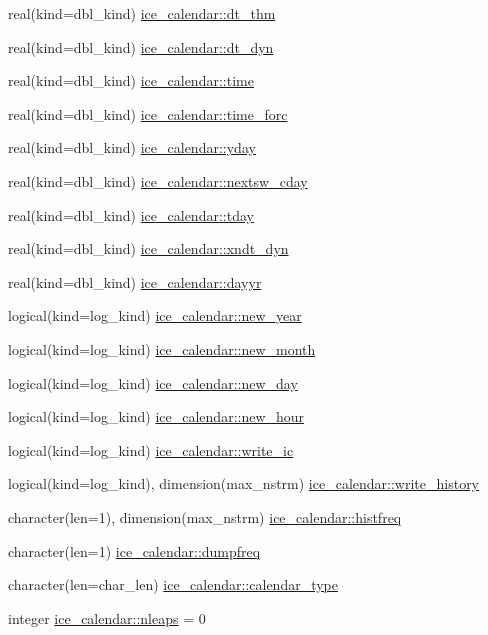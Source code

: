 \begin{DoxyCompactItemize}
\item 
real(kind=dbl\_\-kind) \hyperlink{namespaceice__calendar_a7c18b75ed60a7c1d0cbee86f4bca61de}{ice\_\-calendar::dt\_\-thm}
\item 
real(kind=dbl\_\-kind) \hyperlink{namespaceice__calendar_a3bb2bcfc8ce6074351961d80011c706a}{ice\_\-calendar::dt\_\-dyn}
\item 
real(kind=dbl\_\-kind) \hyperlink{namespaceice__calendar_a41fbc8dd30edf8e90070b7f5569fdd9b}{ice\_\-calendar::time}
\item 
real(kind=dbl\_\-kind) \hyperlink{namespaceice__calendar_abc4a1fb6d6f8356506f078c4265a6ce6}{ice\_\-calendar::time\_\-forc}
\item 
real(kind=dbl\_\-kind) \hyperlink{namespaceice__calendar_a4b4393c99a1d82bc45fcee5d7f6c1eab}{ice\_\-calendar::yday}
\item 
real(kind=dbl\_\-kind) \hyperlink{namespaceice__calendar_a04f5a8dadd1f3a10e3909afc246aebe4}{ice\_\-calendar::nextsw\_\-cday}
\item 
real(kind=dbl\_\-kind) \hyperlink{namespaceice__calendar_a7a56bc05233c72a7b5176c7c2d6abe7c}{ice\_\-calendar::tday}
\item 
real(kind=dbl\_\-kind) \hyperlink{namespaceice__calendar_aaf7ba66b2706feaef77263c10d65e28a}{ice\_\-calendar::xndt\_\-dyn}
\item 
real(kind=dbl\_\-kind) \hyperlink{namespaceice__calendar_a729d7e640fbfecac3733865efcfcb042}{ice\_\-calendar::dayyr}
\item 
logical(kind=log\_\-kind) \hyperlink{namespaceice__calendar_a2d0b7e0b5144d49dd2e39690c5cde21f}{ice\_\-calendar::new\_\-year}
\item 
logical(kind=log\_\-kind) \hyperlink{namespaceice__calendar_adf4af22505e09a7ed33b5c480cce75af}{ice\_\-calendar::new\_\-month}
\item 
logical(kind=log\_\-kind) \hyperlink{namespaceice__calendar_a766cb3e9a2b5b634a04a558bade2457c}{ice\_\-calendar::new\_\-day}
\item 
logical(kind=log\_\-kind) \hyperlink{namespaceice__calendar_a0c8bfc71143cc3c7aef340ad41a9068d}{ice\_\-calendar::new\_\-hour}
\item 
logical(kind=log\_\-kind) \hyperlink{namespaceice__calendar_a0ab845607bc7966960d11bffb6f9f069}{ice\_\-calendar::write\_\-ic}
\item 
logical(kind=log\_\-kind), dimension(max\_\-nstrm) \hyperlink{namespaceice__calendar_a610c4039b3869befd73705569c033bef}{ice\_\-calendar::write\_\-history}
\item 
character(len=1), dimension(max\_\-nstrm) \hyperlink{namespaceice__calendar_a0502fca3c549cbfb5113eddd7de76b20}{ice\_\-calendar::histfreq}
\item 
character(len=1) \hyperlink{namespaceice__calendar_aa26268d5abce218fad113a08bedcf8d9}{ice\_\-calendar::dumpfreq}
\item 
character(len=char\_\-len) \hyperlink{namespaceice__calendar_ad01a9ecbaab3997c0252754dee9aa0c7}{ice\_\-calendar::calendar\_\-type}
\item 
integer \hyperlink{namespaceice__calendar_a671fa04415abb84aa5564c9269f47f81}{ice\_\-calendar::nleaps} = 0
\end{DoxyCompactItemize}
